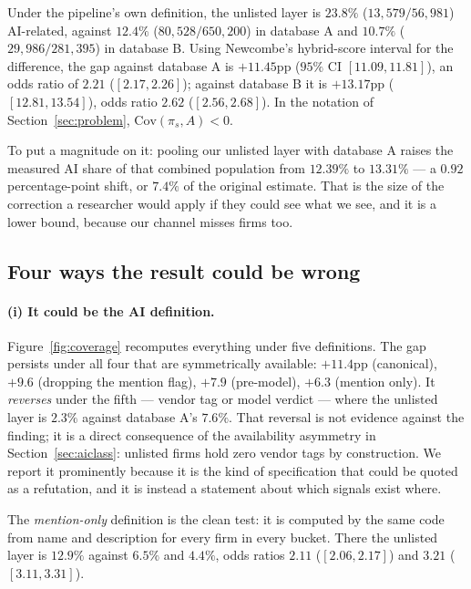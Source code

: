 \documentclass[11pt]{article}
\begin{document}
Under the pipeline's own definition, the unlisted layer is $23.8\%$
($13{,}579/56{,}981$) AI-related, against $12.4\%$ ($80{,}528/650{,}200$) in
database A and $10.7\%$ ($29{,}986/281{,}395$) in database B. Using Newcombe's
hybrid-score interval \citep{newcombe1998intervals} for the difference, the gap
against database A is $+11.45$pp ($95\%$ CI $[11.09, 11.81]$), an odds ratio of
$2.21$ ($[2.17, 2.26]$); against database B it is $+13.17$pp
($[12.81, 13.54]$), odds ratio $2.62$ ($[2.56, 2.68]$). In the notation of
Section~\ref{sec:problem}, $\mathrm{Cov}(\pi_s, A) < 0$.

To put a magnitude on it: pooling our unlisted layer with database A raises the
measured AI share of that combined population from $12.39\%$ to $13.31\%$ --- a
$0.92$ percentage-point shift, or $7.4\%$ of the original estimate. That is the
size of the correction a researcher would apply if they could see what we see,
and it is a lower bound, because our channel misses firms too.

\subsection{Four ways the result could be wrong}

\paragraph{(i) It could be the AI definition.}
Figure~\ref{fig:coverage} recomputes everything under five definitions. The gap
persists under all four that are symmetrically available: $+11.4$pp
(canonical), $+9.6$ (dropping the mention flag), $+7.9$ (pre-model), $+6.3$
(mention only). It \emph{reverses} under the fifth --- vendor tag or model
verdict --- where the unlisted layer is $2.3\%$ against database A's $7.6\%$.
That reversal is not evidence against the finding; it is a direct consequence
of the availability asymmetry in Section~\ref{sec:aiclass}: unlisted firms hold
zero vendor tags by construction. We report it prominently because it is the
kind of specification that could be quoted as a refutation, and it is instead a
statement about which signals exist where.

The \emph{mention-only} definition is the clean test: it is computed by the
same code from name and description for every firm in every bucket. There the
unlisted layer is $12.9\%$ against $6.5\%$ and $4.4\%$, odds ratios $2.11$
($[2.06, 2.17]$) and $3.21$ ($[3.11, 3.31]$).
\end{document}
